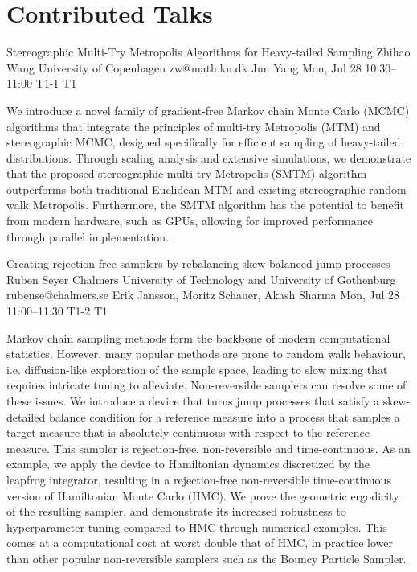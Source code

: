 \section{Contributed Talks}

\begin{talk}
  {Stereographic Multi-Try Metropolis Algorithms for Heavy-tailed Sampling}%
  {Zhihao Wang}%
  {University of Copenhagen}%
  {zw@math.ku.dk}%
  {Jun Yang}%
  {}%
  {Mon, Jul 28 10:30--11:00}%
  {T1-1}%
  {T1}%
  
    
   
We introduce a novel family of gradient-free Markov chain Monte Carlo (MCMC) algorithms that integrate the principles of multi-try Metropolis (MTM) and stereographic MCMC, designed specifically for efficient sampling of heavy-tailed distributions. Through scaling analysis and extensive simulations, we demonstrate that the proposed stereographic multi-try Metropolis (SMTM) algorithm outperforms both traditional Euclidean MTM and existing stereographic random-walk Metropolis. Furthermore, the SMTM algorithm has the potential to benefit from modern hardware, such as GPUs, allowing for improved performance through parallel implementation.
\end{talk}

\begin{talk}
  {Creating rejection-free samplers by rebalancing skew-balanced jump processes}%
  {Ruben Seyer}%
  {Chalmers University of Technology and University of Gothenburg}%
  {rubense@chalmers.se}%
  {Erik Jansson, Moritz Schauer, Akash Sharma}%
  {}%
  {Mon, Jul 28 11:00--11:30}%
  {T1-2}%
  {T1}%
  
    
   
Markov chain sampling methods form the backbone of modern computational statistics.
However, many popular methods are prone to random walk behaviour, i.e.\@{} diffusion-like exploration of the sample space, leading to slow mixing that requires intricate tuning to alleviate.
Non-reversible samplers can resolve some of these issues.
We introduce a device that turns jump processes that satisfy a skew-detailed balance condition for a reference measure into a process that samples a target measure that is absolutely continuous with respect to the reference measure.
This sampler is rejection-free, non-reversible and time-continuous.
As an example, we apply the device to Hamiltonian dynamics discretized by the leapfrog integrator, resulting in a rejection-free non-reversible time-continuous version of Hamiltonian Monte Carlo (HMC).
We prove the geometric ergodicity of the resulting sampler, and demonstrate its increased robustness to hyperparameter tuning compared to HMC through numerical examples.
This comes at a computational cost at worst double that of HMC, in practice lower than other popular non-reversible samplers such as the Bouncy Particle Sampler.
\end{talk}

